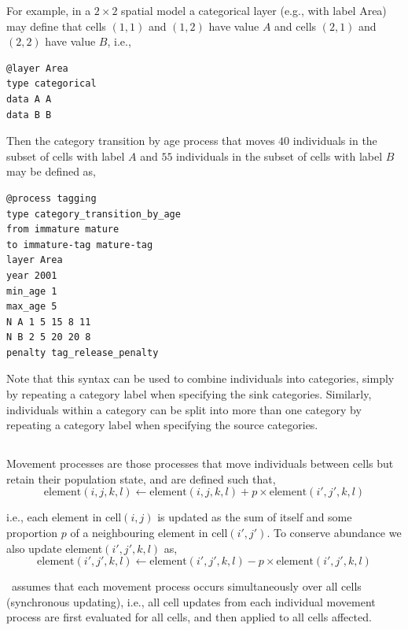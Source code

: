 For example, in a $2 \times 2$ spatial model a categorical layer (e.g., with label Area) may define that cells $(1,1)$ and $(1,2)$ have value $A$ and cells $(2,1)$ and $(2,2)$ have value $B$, i.e.,
{\small{\begin{verbatim}
@layer Area
type categorical
data A A 
data B B
\end{verbatim}}}

Then the category transition by age process that moves $40$ individuals in the subset of cells with label $A$ and $55$ individuals in the subset of cells with label $B$ may be defined as, 
{\small{\begin{verbatim}
@process tagging
type category_transition_by_age
from immature mature
to immature-tag mature-tag
layer Area
year 2001
min_age 1
max_age 5
N A 1 5 15 8 11
N B 2 5 20 20 8
penalty tag_release_penalty
\end{verbatim}}}

Note that this syntax can be used to combine individuals into categories, simply by repeating a category label when specifying the sink categories. Similarly, individuals within a category can be split into more than one category by repeating a category label when specifying the source categories.

\subsection{\label{sec:movement-processes}}

Movement processes are those processes that move individuals between cells but retain their population state, and are defined such that,
\begin{equation}
\text{element}(i,j,k,l)\leftarrow \text{element}(i,j,k,l) + p \times \text{element}(i',j',k,l)
\end{equation}

i.e., each element in cell$(i,j)$ is updated as the sum of itself and some proportion $p$ of a neighbouring element in cell$(i',j')$. To conserve abundance we also update element$(i',j',k,l)$ as,
\begin{equation}
\text{element}(i',j',k,l)\leftarrow \text{element}(i',j',k,l) - p\times \text{element}(i',j',k,l)
\end{equation}

\SPM\ assumes that each movement process occurs simultaneously over all cells (synchronous updating), i.e., all cell updates from each individual movement process are first evaluated for all cells, and then applied to all cells affected. 

